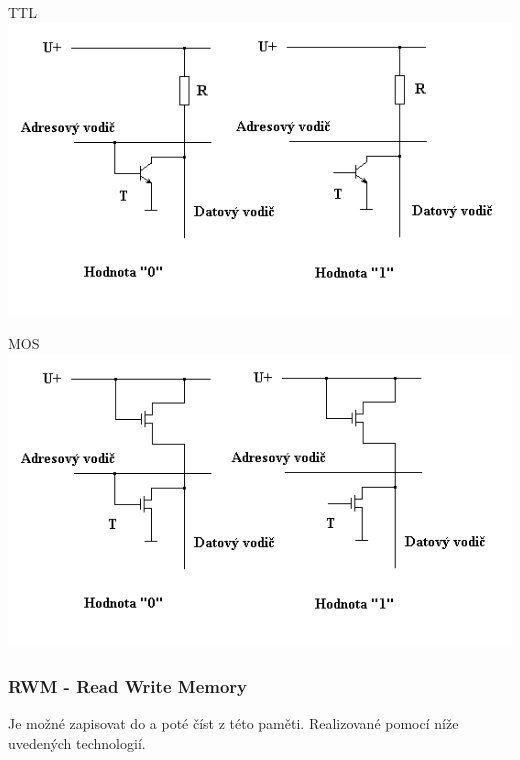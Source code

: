 \begin{multicols}{2}
    \begin{center}
      TTL \\
      \includegraphics[width=1.2\linewidth]{TVY-POS/Polovodičové paměti/ROMTTL.png}
    \end{center}
    \columnbreak
    \begin{center}
      MOS \\
      \includegraphics[width=1.2\linewidth]{TVY-POS/Polovodičové paměti/ROMMOS.png}
    \end{center}
\end{multicols}
\subsubsection{RWM - Read Write Memory}
Je možné zapisovat do a poté číst z této paměti.
Realizované pomocí níže uvedených technologií.
\newpage
